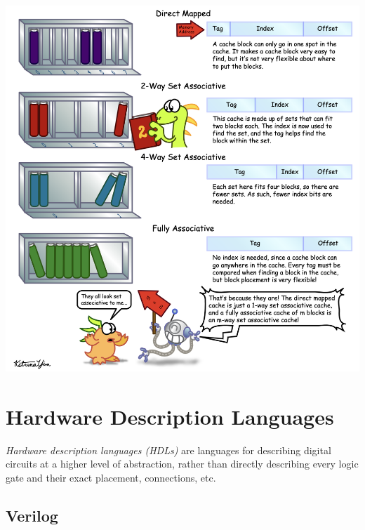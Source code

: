 \documentclass[10pt,a4paper]{article}
\begin{document}
\begin{center}
    \includegraphics[scale=0.35]{images/cache_assoc.png}
\end{center}

\section{Hardware Description Languages}


\textit{Hardware description languages (HDLs)} are languages for describing digital circuits at a higher level of abstraction, rather than directly describing every logic gate and their exact placement, connections, etc. 

\subsection*{Verilog}
\end{document}
